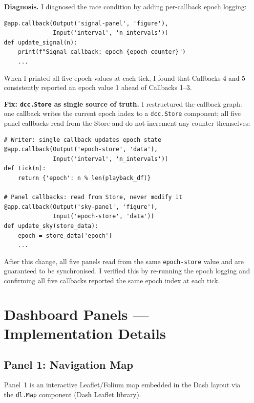 \documentclass[12pt,a4paper]{article}
\newcommand{\code}[1]{\texttt{#1}}
\begin{document}
\textbf{Diagnosis.}
I diagnosed the race condition by adding per-callback epoch logging:

\begin{lstlisting}
@app.callback(Output('signal-panel', 'figure'),
              Input('interval', 'n_intervals'))
def update_signal(n):
    print(f"Signal callback: epoch {epoch_counter}")
    ...
\end{lstlisting}

When I printed all five epoch values at each tick, I found that Callbacks 4 and 5
consistently reported an epoch value 1 ahead of Callbacks 1--3.

\textbf{Fix: \code{dcc.Store} as single source of truth.}
I restructured the callback graph: one callback writes the current epoch index to a
\code{dcc.Store} component; all five panel callbacks read from the Store and do not
increment any counter themselves:

\begin{lstlisting}
# Writer: single callback updates epoch state
@app.callback(Output('epoch-store', 'data'),
              Input('interval', 'n_intervals'))
def tick(n):
    return {'epoch': n % len(playback_df)}

# Panel callbacks: read from Store, never modify it
@app.callback(Output('sky-panel', 'figure'),
              Input('epoch-store', 'data'))
def update_sky(store_data):
    epoch = store_data['epoch']
    ...
\end{lstlisting}

After this change, all five panels read from the same \code{epoch-store} value and
are guaranteed to be synchronised.
I verified this by re-running the epoch logging and confirming all five callbacks
reported the same epoch index at each tick.

\section{Dashboard Panels --- Implementation Details}

\subsection{Panel 1: Navigation Map}

Panel~1 is an interactive Leaflet/Folium map embedded in the Dash layout via the
\code{dl.Map} component (Dash Leaflet library).
\end{document}
